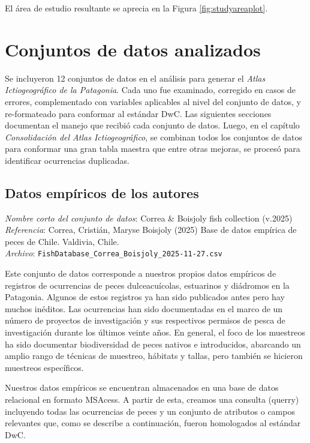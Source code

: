\documentclass[sn-apa,pdflatex]{sn-jnl}
\begin{document}
El área de estudio resultante se aprecia en la Figura
\ref{fig:studyareaplot}.

\section{Conjuntos de datos
analizados}\label{conjuntos-de-datos-analizados}

Se incluyeron 12 conjuntos de datos en el análisis para generar el
\emph{Atlas Ictiogeográfico de la Patagonia}. Cada uno fue examinado,
corregido en casos de errores, complementado con variables aplicables al
nivel del conjunto de datos, y re-formateado para conformar al estándar
DwC. Las siguientes secciones documentan el manejo que recibió cada
conjunto de datos. Luego, en el capítulo \emph{Consolidación del Atlas
Ictiogeográfico}, se combinan todos los conjuntos de datos para
conformar una gran tabla maestra que entre otras mejoras, se procesó
para identificar ocurrencias duplicadas.

\subsection{Datos empíricos de los
autores}\label{datos-empuxedricos-de-los-autores}

\emph{Nombre corto del conjunto de datos}: Correa \& Boisjoly fish
collection (v.2025)\\
\emph{Referencia}: Correa, Cristián, Maryse Boisjoly (2025) Base de
datos empírica de peces de Chile. Valdivia, Chile. \citep{Correa2025}\\
\emph{Archivo}: \texttt{FishDatabase\_Correa\_Boisjoly\_2025-11-27.csv}

Este conjunto de datos corresponde a nuestros propios datos empíricos de
registros de ocurrencias de peces dulceacuícolas, estuarinos y diádromos
en la Patagonia. Algunos de estos registros ya han sido publicados antes
pero hay muchos inéditos. Las ocurrencias han sido documentadas en el
marco de un número de proyectos de investigación y sus respectivos
permisos de pesca de investigación durante los últimos veinte años. En
general, el foco de los muestreos ha sido documentar biodiversidad de
peces nativos e introducidos, abarcando un amplio rango de técnicas de
muestreo, hábitats y tallas, pero también se hicieron muestreos
específicos.

Nuestros datos empíricos se encuentran almacenados en una base de datos
relacional en formato MSAcess. A partir de esta, creamos una consulta
(querry) incluyendo todas las ocurrencias de peces y un conjunto de
atributos o campos relevantes que, como se describe a continuación,
fueron homologados al estándar DwC.
\end{document}
